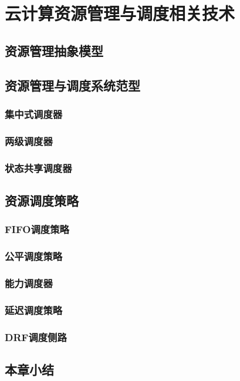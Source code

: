 
\chapter{云计算资源管理与调度相关技术}
\label{chap:outline}

\section{资源管理抽象模型}
\section{资源管理与调度系统范型}
\subsection{集中式调度器}
\subsection{两级调度器}
\subsection{状态共享调度器}
\section{资源调度策略}
\subsection{FIFO调度策略}
\subsection{公平调度策略}
\subsection{能力调度器}
\subsection{延迟调度策略}
\subsection{DRF调度侧路}
\section{本章小结}

